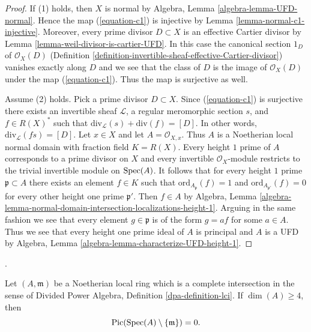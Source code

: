 \begin{proof}
If (1) holds, then $X$ is normal by
Algebra, Lemma \ref{algebra-lemma-UFD-normal}.
Hence the map (\ref{equation-c1}) is injective by
Lemma \ref{lemma-normal-c1-injective}. Moreover,
every prime divisor $D \subset X$ is an effective
Cartier divisor by Lemma \ref{lemma-weil-divisor-is-cartier-UFD}.
In this case the canonical section $1_D$ of $\mathcal{O}_X(D)$
(Definition \ref{definition-invertible-sheaf-effective-Cartier-divisor})
vanishes exactly along $D$ and we see that the class of $D$ is the
image of $\mathcal{O}_X(D)$ under the map (\ref{equation-c1}).
Thus the map is surjective as well.

\medskip\noindent
Assume (2) holds. Pick a prime divisor $D \subset X$.
Since (\ref{equation-c1}) is surjective there exists an invertible
sheaf $\mathcal{L}$, a regular meromorphic section $s$, and $f \in R(X)^*$
such that $\text{div}_\mathcal{L}(s) + \text{div}(f) = [D]$.
In other words, $\text{div}_\mathcal{L}(fs) = [D]$.
Let $x \in X$ and let $A = \mathcal{O}_{X, x}$. Thus $A$ is
a Noetherian local normal domain with fraction field $K = R(X)$.
Every height $1$ prime of $A$ corresponds to a prime divisor on $X$
and every invertible $\mathcal{O}_X$-module restricts to the
trivial invertible module on $\mathop{\mathrm{Spec}}(A)$. It follows that for every
height $1$ prime $\mathfrak p \subset A$ there exists an element $f \in K$
such that $\text{ord}_{A_\mathfrak p}(f) = 1$ and
$\text{ord}_{A_{\mathfrak p'}}(f) = 0$ for every other
height one prime $\mathfrak p'$. Then $f \in A$ by Algebra, Lemma
\ref{algebra-lemma-normal-domain-intersection-localizations-height-1}.
Arguing in the same fashion we see that every element $g \in \mathfrak p$
is of the form $g = af$ for some $a \in A$. Thus we see that every
height one prime ideal of $A$ is principal and $A$ is a UFD
by Algebra, Lemma \ref{algebra-lemma-characterize-UFD-height-1}.
\end{proof}







\begin{theorem}
\label{theorem-ci-parafactorial}
\begin{reference}
\cite[Expos\'e XI, Th\'eor\`eme 3.13(ii)]{SGA2}.
\end{reference}
Let $(A, \mathfrak m)$ be a Noetherian local ring which is a complete
intersection in the sense of Divided Power Algebra, Definition
\ref{dpa-definition-lci}. If $\dim(A)\geq 4$, then
$$
\mathop{\mathrm{Pic}}\nolimits(\mathop{\mathrm{Spec}}(A)\setminus\{\mathfrak m\})=0.
$$
\end{theorem}

